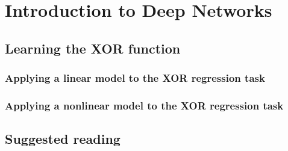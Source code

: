 \renewcommand{\prevpart}{1}
\renewcommand{\thispart}{2}
\renewcommand{\nextpart}{3}

\section{Introduction to Deep Networks}





\subsection{Learning the XOR function}

\subsubsection{Applying a linear model to the XOR regression task}

\subsubsection{Applying a nonlinear model to the XOR regression task}


\subsection{Suggested reading}


